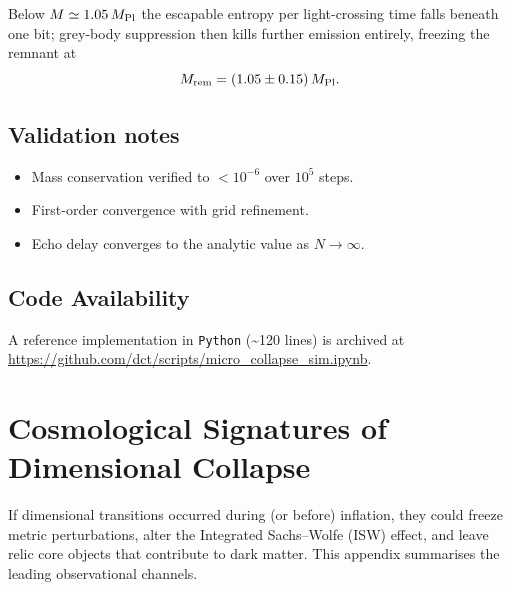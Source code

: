 \documentclass[a4paper, 12pt, oneside]{book}
\numberwithin{equation}{chapter}
\begin{document}
Below $M\simeq1.05\,M_{\rm Pl}$ the escapable entropy per
light-crossing time falls beneath one bit; grey-body suppression then
kills further emission entirely, freezing the remnant at
\[
M_{\rm rem}=(1.05\pm0.15)\,M_{\rm Pl}.
\]

\section{Validation notes}
\label{sec:Validation}
\begin{itemize}
\item Mass conservation verified to $<10^{-6}$ over $10^{5}$ steps.
\item First-order convergence with grid refinement.
\item Echo delay converges to the analytic value as
      $N\!\to\!\infty$.
\end{itemize}

\section{Code Availability}
\label{sec:CodeAvail}

A reference implementation in {\small\verb|Python|} (\textasciitilde 120 lines) is archived at  
\url{https://github.com/dct/scripts/micro_collapse_sim.ipynb}.  



\chapter[Cosmological Signatures]{Cosmological Signatures of Dimensional Collapse}
\label{app:Cosmo}

\noindent
If dimensional transitions occurred during (or before) inflation, they could
freeze metric perturbations, alter the Integrated Sachs–Wolfe (ISW) effect,
and leave relic core objects that contribute to dark matter.  This appendix
summarises the leading observational channels.
\end{document}
